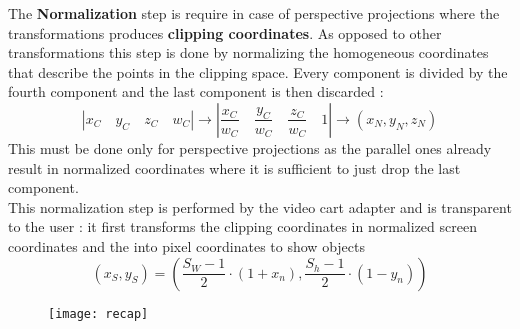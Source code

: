 The \textbf{Normalization } step is require in case of perspective projections where the transformations produces \textbf{clipping coordinates}. As opposed  to other transformations this step is done by normalizing the homogeneous coordinates that describe the points  in the clipping space. Every component is divided by the fourth component and the last component is then discarded :
$$ |x_C \quad y_C \quad z_C \quad w_C| \to \left | \frac{x_C}{w_C} \quad \frac{y_C}{w_C} \quad \frac{z_C}{w_C} \quad 1 \right | \to (x_N,y_N,z_N)$$
This must be done only for perspective projections as the parallel ones already result in normalized coordinates where it is sufficient to just drop the last component.\\
This normalization step is performed by the video cart adapter and is transparent to the user : it first transforms the clipping coordinates in normalized screen coordinates and the into pixel coordinates to show objects
$$ (x_S,y_S) = \left ( \frac{S_W-1}{2} \cdot(1+x_n) , \frac{S_h-1}{2} \cdot(1-y_n) \right )$$
\begin{figure}[H]
  \centering
  \texttt{[image: recap]}
\end{figure}

